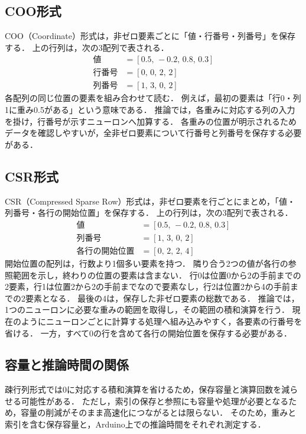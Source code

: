 \documentclass[a4paper,11pt]{article}
\begin{document}
\subsection{COO形式}
COO（Coordinate）形式は，非ゼロ要素ごとに「値・行番号・列番号」を保存する\cite{scipy-coo}．
上の行列は，次の3配列で表される．
\[
 \begin{aligned}
 \text{値}&=[0.5,\,-0.2,\,0.8,\,0.3]\\
 \text{行番号}&=[0,\,0,\,2,\,2]\\
 \text{列番号}&=[1,\,3,\,0,\,2]
 \end{aligned}
\]
各配列の同じ位置の要素を組み合わせて読む．
例えば，最初の要素は「行0・列1に重み0.5がある」という意味である．
推論では，各重みに対応する列の入力を掛け，行番号が示すニューロンへ加算する．
各重みの位置が明示されるためデータを確認しやすいが，全非ゼロ要素について行番号と列番号を保存する必要がある．

\subsection{CSR形式}
CSR（Compressed Sparse Row）形式は，非ゼロ要素を行ごとにまとめ，「値・列番号・各行の開始位置」を保存する\cite{scipy-csr}．
上の行列は，次の3配列で表される．
\[
  \begin{aligned}
  \text{値}&=[0.5,\,-0.2,\,0.8,\,0.3]\\
  \text{列番号}&=[1,\,3,\,0,\,2]\\
  \text{各行の開始位置}&=[0,\,2,\,2,\,4]
  \end{aligned}
\]
開始位置の配列は，行数より1個多い要素を持つ．
隣り合う2つの値が各行の参照範囲を示し，終わりの位置の要素は含まない．
行0は位置0から2の手前までの2要素，行1は位置2から2の手前までなので要素なし，行2は位置2から4の手前までの2要素となる．
最後の4は，保存した非ゼロ要素の総数である．
推論では，1つのニューロンに必要な重みの範囲を取得し，その範囲の積和演算を行う．
現在のようにニューロンごとに計算する処理へ組み込みやすく，各要素の行番号を省ける．
一方，すべて0の行を含めて各行の開始位置を保存する必要がある．

\subsection{容量と推論時間の関係}
疎行列形式では0に対応する積和演算を省けるため，保存容量と演算回数を減らせる可能性がある．
ただし，索引の保存と参照にも容量や処理が必要となるため，容量の削減がそのまま高速化につながるとは限らない．
そのため，重みと索引を含む保存容量と，Arduino上での推論時間をそれぞれ測定する．
\end{document}
